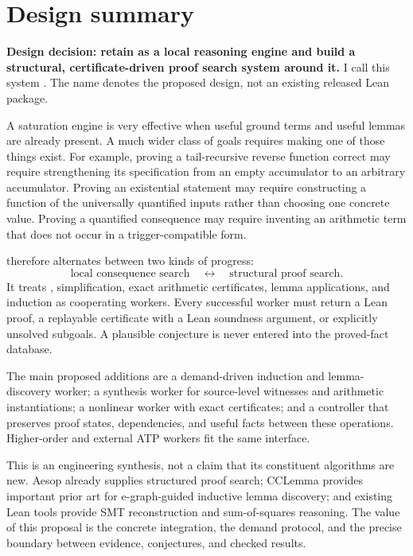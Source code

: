 \section{Design summary}

\textbf{Design decision: retain \Grind{} as a local reasoning engine and build a
structural, certificate-driven proof search system around it.} I call this
system \Forge{}. The name denotes the proposed design, not an existing released
Lean package.

A saturation engine is very effective when useful ground terms and useful
lemmas are already present. A much wider class of goals requires making one of
those things exist. For example, proving a tail-recursive reverse function
correct may require strengthening its specification from an empty accumulator
to an arbitrary accumulator. Proving an existential statement may require
constructing a function of the universally quantified inputs rather than
choosing one concrete value. Proving a quantified consequence may require
inventing an arithmetic term that does not occur in a trigger-compatible form.

\Forge{} therefore alternates between two kinds of progress:
\[
\boxed{\text{local consequence search}}
\quad\longleftrightarrow\quad
\boxed{\text{structural proof search}}.
\]
It treats \Grind{}, simplification, exact arithmetic certificates, lemma
applications, and induction as cooperating workers. Every successful worker
must return a Lean proof, a replayable certificate with a Lean soundness
argument, or explicitly unsolved subgoals. A plausible conjecture is never
entered into the proved-fact database.

The main proposed additions are a demand-driven induction and lemma-discovery
worker; a synthesis worker for source-level witnesses and arithmetic
instantiations; a nonlinear worker with exact certificates; and a controller
that preserves proof states, dependencies, and useful facts between these
operations. Higher-order and external ATP workers fit the same interface.

This is an engineering synthesis, not a claim that its constituent algorithms
are new. Aesop already supplies structured proof search; CCLemma provides
important prior art for e-graph-guided inductive lemma discovery; and existing
Lean tools provide SMT reconstruction and sum-of-squares reasoning. The value
of this proposal is the concrete integration, the demand protocol, and the
precise boundary between evidence, conjectures, and checked results.
\cite{aesop,cclemma,leansmt,sos}

